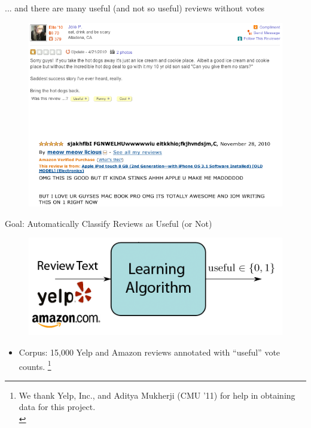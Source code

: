 \documentclass{beamer}
\begin{document}
\begin{frame}{... and there are many useful (and not so useful) reviews without votes}
\begin{figure}[h]
  \centering
  \includegraphics[scale=.4]{review_unvoted}
  \label{fig:dist}
\end{figure}
\end{frame}

\begin{frame}{Goal: Automatically Classify Reviews as Useful (or Not)}
\begin{figure}[h]
  \centering
  \includegraphics[scale=.4]{learning_summary}
  \label{fig:dist}
\end{figure}
\begin{itemize}
\item Corpus: 15,000 Yelp and Amazon reviews annotated with ``useful'' vote counts. \footnote{{\tiny We thank Yelp, Inc., and Aditya Mukherji (CMU '11) for help in obtaining data for this project.}\\}
\end{itemize}
\end{frame}
\end{document}

